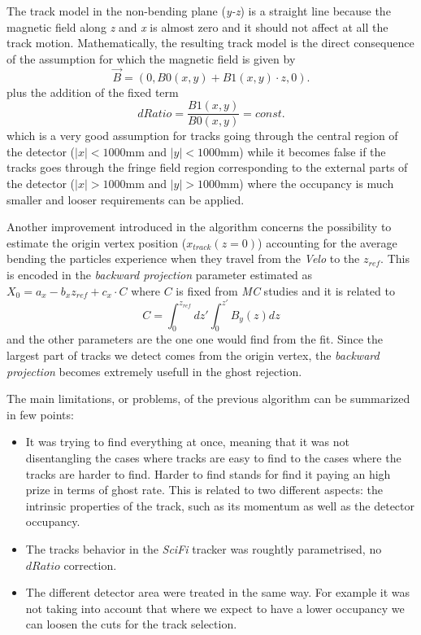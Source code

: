 \documentclass[paper=a4, fontsize=10pt]{scrartcl}
\numberwithin{equation}{section}		%
\numberwithin{figure}{section}			%
\numberwithin{table}{section}				%
\begin{document}
The track model in the non-bending plane (\textit{y-z}) is a straight line because the magnetic field along \textit{z} and \textit{x} is almost zero and it should not affect at all the track motion. Mathematically, the resulting track model is the direct consequence of the assumption for which the magnetic field is given by $$\overrightarrow{B} = (0,B0(x,y)+B1(x,y) \cdot z,0).$$ plus the addition of the fixed term $$dRatio = \frac{B1(x,y)}{B0(x,y)}=const.$$ which is a very good assumption for tracks going through the central region of the detector ($|x|<1000$mm and $|y|<1000$mm) while it becomes false if the tracks goes through the fringe field region corresponding to the external parts of the detector ($|x|>1000$mm and $|y|>1000$mm) where the occupancy is much smaller and looser requirements can be applied.

Another improvement introduced in the algorithm concerns the possibility to estimate the origin vertex position ($x_{track}(z=0)$) accounting for the average bending the particles experience when they travel from the \textit{Velo} to the $z_{ref}$.
This is encoded in the \textit{backward projection} parameter estimated as $X_{0}=a_{x}-b_x z_{ref} + c_{x}\cdot C$ where $C$ is fixed from \textit{MC} studies and it is related to $$C = \int _{ 0 }^{ { z }_{ ref } }{ dz' } \int _{ 0 }^{ z' }{ { B }_{ y }(z) } dz$$ and the other parameters are the one one would find from the fit.
Since the largest part of tracks we detect comes from the origin vertex, the \textit{backward projection} becomes extremely usefull in the ghost rejection.


The main limitations, or problems, of the previous algorithm can be summarized in few points:
\begin{itemize} 
\item{It was trying to find everything at once, meaning that it was not disentangling the cases where tracks are easy to find to the cases where the tracks are harder to find. Harder to find stands for find it paying an high prize in terms of ghost rate. This is related to two different aspects: the intrinsic properties of the track, such as its momentum as well as the detector occupancy.}
\item{The tracks behavior in the \textit{SciFi} tracker was roughtly parametrised, no $dRatio$ correction.} 
\item{The different detector area were treated in the same way. For example it was not taking into account that where we expect to have a lower occupancy we can loosen the cuts for the track selection.}
\end{itemize}
\end{document}
